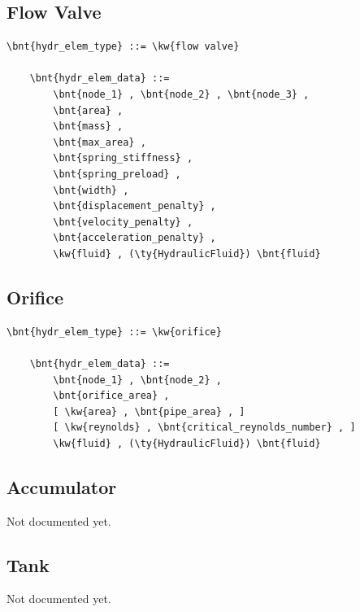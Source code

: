 \subsection{Flow Valve}
\label{sec:EL:HYDR:FLOW_VALVE}
\begin{Verbatim}[commandchars=\\\{\}]
    \bnt{hydr_elem_type} ::= \kw{flow valve}

    \bnt{hydr_elem_data} ::=
        \bnt{node_1} , \bnt{node_2} , \bnt{node_3} ,
        \bnt{area} ,
        \bnt{mass} ,
        \bnt{max_area} ,
        \bnt{spring_stiffness} ,
        \bnt{spring_preload} ,
        \bnt{width} ,
        \bnt{displacement_penalty} ,
        \bnt{velocity_penalty} ,
        \bnt{acceleration_penalty} ,
        \kw{fluid} , (\ty{HydraulicFluid}) \bnt{fluid}
\end{Verbatim}



\subsection{Orifice}
\label{sec:EL:HYDR:ORIFICE}
\begin{Verbatim}[commandchars=\\\{\}]
    \bnt{hydr_elem_type} ::= \kw{orifice}

    \bnt{hydr_elem_data} ::=
        \bnt{node_1} , \bnt{node_2} ,
        \bnt{orifice_area} ,
        [ \kw{area} , \bnt{pipe_area} , ]
        [ \kw{reynolds} , \bnt{critical_reynolds_number} , ]
        \kw{fluid} , (\ty{HydraulicFluid}) \bnt{fluid}
\end{Verbatim}



\subsection{Accumulator}
\label{sec:EL:HYDR:ACCUMULATOR}
Not documented yet.



\subsection{Tank}
\label{sec:EL:HYDR:TANK}
Not documented yet.



